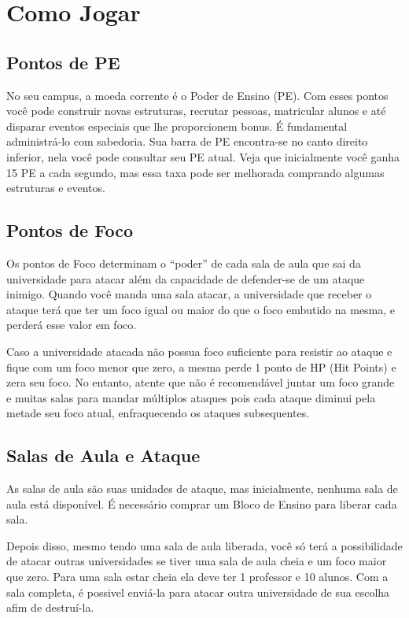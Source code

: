 \documentclass[brazil,times]{abnt}
\begin{document}
\chapter{Como Jogar}

\section{Pontos de PE}
No seu campus, a moeda corrente é o Poder de Ensino (PE). Com esses pontos você
pode construir novas estruturas, recrutar pessoas, matricular alunos e até
disparar eventos especiais que lhe proporcionem bonus. É fundamental
administrá-lo com sabedoria. Sua barra de PE encontra-se no canto direito
inferior, nela você pode consultar seu PE atual. Veja que inicialmente você
ganha 15 PE a cada segundo, mas essa taxa pode ser melhorada comprando algumas
estruturas e eventos.

\section{Pontos de Foco}
Os pontos de Foco determinam o ``poder'' de cada sala de aula que sai da
universidade para atacar além da capacidade de defender-se de um ataque inimigo.
Quando você manda uma sala atacar, a universidade que receber o ataque terá que
ter um foco igual ou maior do que o foco embutido na mesma, e perderá esse
valor em foco.

Caso a universidade atacada não possua foco suficiente para resistir ao ataque e
fique com um foco menor que zero, a mesma perde 1 ponto de HP (Hit Points) e
zera seu foco. No entanto, atente que não é recomendável juntar um foco grande e
muitas salas para mandar múltiplos ataques pois cada ataque diminui pela metade
seu foco atual, enfraquecendo os ataques subsequentes.

\section{Salas de Aula e Ataque}
As salas de aula são suas unidades de ataque, mas inicialmente, nenhuma sala de
aula está disponível. É necessário comprar um Bloco de Ensino para liberar cada
sala.

Depois disso, mesmo tendo uma sala de aula liberada, você só terá a
possibilidade de atacar outras universidades se tiver uma sala de aula cheia e
um foco maior que zero. Para uma sala estar cheia ela deve ter 1 professor e 10
alunos. Com a sala completa, é possivel enviá-la para atacar outra universidade
de sua escolha afim de destruí-la.
\end{document}
